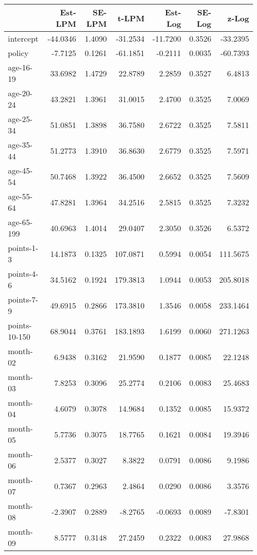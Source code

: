 \documentclass[10pt]{article}
\begin{document}
\begin{table}[ht]
\centering
\begin{tabular}{lrrrrrr}
  \hline
 & Est-LPM & SE-LPM & t-LPM & Est-Log & SE-Log & z-Log \\ 
  \hline
intercept & -44.0346 & 1.4090 & -31.2534 & -11.7200 & 0.3526 & -33.2395 \\ 
  policy & -7.7125 & 0.1261 & -61.1851 & -0.2111 & 0.0035 & -60.7393 \\ 
  age-16-19 & 33.6982 & 1.4729 & 22.8789 & 2.2859 & 0.3527 & 6.4813 \\ 
  age-20-24 & 43.2821 & 1.3961 & 31.0015 & 2.4700 & 0.3525 & 7.0069 \\ 
  age-25-34 & 51.0851 & 1.3898 & 36.7580 & 2.6722 & 0.3525 & 7.5811 \\ 
  age-35-44 & 51.2773 & 1.3910 & 36.8630 & 2.6779 & 0.3525 & 7.5971 \\ 
  age-45-54 & 50.7468 & 1.3922 & 36.4500 & 2.6652 & 0.3525 & 7.5609 \\ 
  age-55-64 & 47.8281 & 1.3964 & 34.2516 & 2.5815 & 0.3525 & 7.3232 \\ 
  age-65-199 & 40.6963 & 1.4014 & 29.0407 & 2.3050 & 0.3526 & 6.5372 \\ 
  points-1-3 & 14.1873 & 0.1325 & 107.0871 & 0.5994 & 0.0054 & 111.5675 \\ 
  points-4-6 & 34.5162 & 0.1924 & 179.3813 & 1.0944 & 0.0053 & 205.8018 \\ 
  points-7-9 & 49.6915 & 0.2866 & 173.3810 & 1.3546 & 0.0058 & 233.1464 \\ 
  points-10-150 & 68.9044 & 0.3761 & 183.1893 & 1.6199 & 0.0060 & 271.1263 \\ 
  month-02 & 6.9438 & 0.3162 & 21.9590 & 0.1877 & 0.0085 & 22.1248 \\ 
  month-03 & 7.8253 & 0.3096 & 25.2774 & 0.2106 & 0.0083 & 25.4683 \\ 
  month-04 & 4.6079 & 0.3078 & 14.9684 & 0.1352 & 0.0085 & 15.9372 \\ 
  month-05 & 5.7736 & 0.3075 & 18.7765 & 0.1621 & 0.0084 & 19.3946 \\ 
  month-06 & 2.5377 & 0.3027 & 8.3822 & 0.0791 & 0.0086 & 9.1986 \\ 
  month-07 & 0.7367 & 0.2963 & 2.4864 & 0.0290 & 0.0086 & 3.3576 \\ 
  month-08 & -2.3907 & 0.2889 & -8.2765 & -0.0693 & 0.0089 & -7.8301 \\ 
  month-09 & 8.5777 & 0.3148 & 27.2459 & 0.2322 & 0.0083 & 27.9868 \\ 

\end{tabular}
\end{table}
\end{document}
